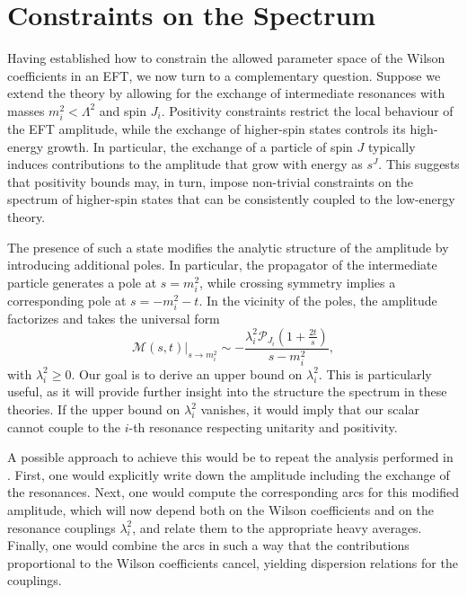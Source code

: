 \section{Constraints on the Spectrum}
\label{sec:res}
Having established how to constrain the allowed parameter space of the Wilson coefficients in an EFT, we now turn to a complementary question. Suppose we extend the theory by allowing for the exchange of intermediate resonances with masses $m_i^2 < \Lambda^2$ and spin $J_i$. Positivity constraints restrict the local behaviour of the EFT amplitude, while the exchange of higher-spin states controls its high-energy growth. In particular, the exchange of a particle of spin $J$ typically induces contributions to the amplitude that grow with energy as $s^{J}$. 
This suggests that positivity bounds may, in turn, impose non-trivial constraints on the spectrum of higher-spin states that can be consistently coupled to the low-energy theory.

The presence of such a state modifies the analytic structure of the amplitude by introducing additional poles. In particular, the propagator of the intermediate particle generates a pole at $s=m_i^2$, while crossing symmetry implies a corresponding pole at $s = -m_i^2 - t$.
In the vicinity of the poles, the amplitude factorizes and takes the universal form \autocite{Huang:2025icl}
\begin{equation}
    \mathcal{M}(s,t)|_{s \to m_i^2} \sim -\frac{\lambda_i^2 \mathcal{P}_{J_i}\left(1 + \frac{2t}{s}\right)}{s - m_i^2},
\end{equation}
with $\lambda_i^2 \geq 0$. Our goal is to derive an upper bound on $\lambda_i^2$. This is particularly useful, as it will provide further insight into the structure the spectrum in these theories. If the upper bound on $\lambda_i^2$ vanishes, it would imply that our scalar cannot couple to the $i$-th resonance respecting unitarity and positivity.

A possible approach to achieve this would be to repeat the analysis performed in . First, one would explicitly write down the amplitude including the exchange of the resonances. Next, one would compute the corresponding arcs for this modified amplitude, which will now depend both on the Wilson coefficients and on the resonance couplings $\lambda_i^2$, and relate them to the appropriate heavy averages. Finally, one would combine the arcs in such a way that the contributions proportional to the Wilson coefficients cancel, yielding dispersion relations for the couplings.

